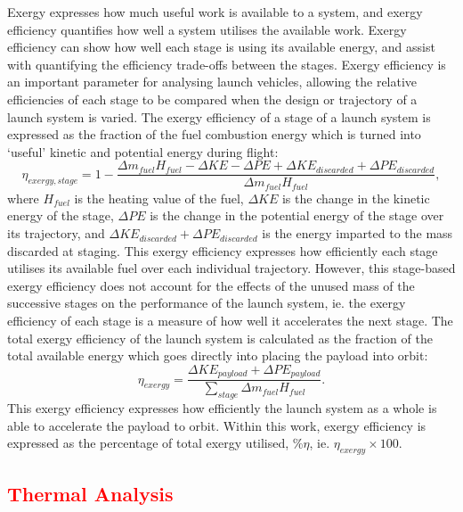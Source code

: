 Exergy expresses how much useful work is available to a system, and exergy efficiency quantifies how well a system utilises the available work. 
 Exergy efficiency can show how well each stage is using its available energy, and assist with quantifying the efficiency trade-offs between the stages.
 Exergy efficiency is an important parameter for analysing launch vehicles, allowing the relative efficiencies of each stage to be compared when the design or trajectory of a launch system is varied\cite{Gilbert2015}. The exergy efficiency of a stage of a launch system is expressed as the fraction of the fuel combustion energy which is turned into `useful' kinetic and potential energy during flight:
\begin{equation}
\eta_{exergy,stage} = 1 - \frac{\Delta m_{fuel}H_{fuel} - \Delta KE -\Delta PE + \Delta KE_{discarded} + \Delta PE_{discarded}}{\Delta m_{fuel}H_{fuel}},
\end{equation}
where $H_{fuel}$ is the heating value of the fuel, $\Delta KE$ is the change in the kinetic energy of the stage, $\Delta PE$ is the change in the potential energy of the stage over its trajectory, and $\Delta KE_{discarded} + \Delta PE_{discarded}$ is the energy imparted to the mass discarded at staging.
This exergy efficiency expresses how efficiently each stage utilises its available fuel over each individual trajectory. However, this stage-based exergy efficiency does not account for the effects of the unused mass of the successive stages on the performance of the launch system, ie. the exergy efficiency of each stage is a measure of how well it accelerates the next stage. The total exergy efficiency of the launch system is calculated as the fraction of the total available energy which goes directly into placing the payload into orbit:
\begin{equation}
\eta_{exergy} = \frac{\Delta KE_{payload} + \Delta PE_{payload}}{\sum_{stage} \Delta m_{fuel}H_{fuel}}.
\end{equation}
This exergy efficiency expresses how efficiently the launch system as a whole is able to accelerate the payload to orbit. 
Within this work, exergy efficiency is expressed as the percentage of total exergy utilised, \%$\eta$, ie. $\eta_{exergy} \times 100$.


\textcolor{red}{
	\section{Thermal Analysis}\label{sec:therm}
}

